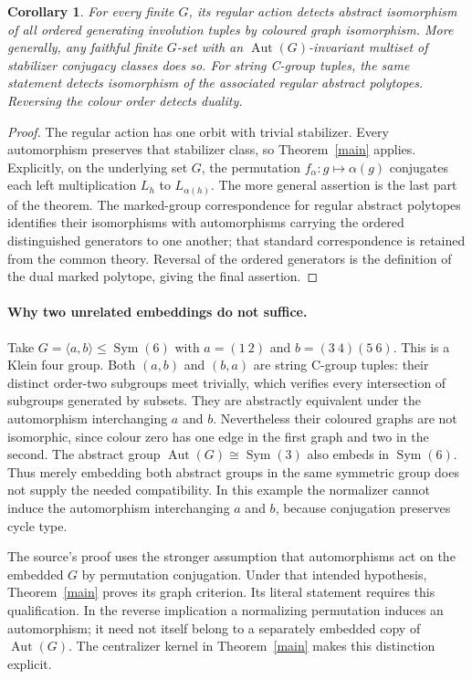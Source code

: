 \documentclass[11pt,a4paper]{article}
\newtheorem{corollary}[theorem]{Corollary}
\newcommand{\Aut}{\operatorname{Aut}}
\newcommand{\Sym}{\operatorname{Sym}}
\begin{document}
\begin{corollary}\label{regular}
For every finite $G$, its regular action detects abstract isomorphism
of all ordered generating involution tuples by coloured graph
isomorphism. More generally, any faithful finite $G$-set with an
$\Aut(G)$-invariant multiset of stabilizer conjugacy classes does so.
For string C-group tuples, the same statement detects isomorphism
of the associated regular abstract polytopes. Reversing the colour
order detects duality.
\end{corollary}
\begin{proof}
The regular action has one orbit with trivial stabilizer. Every
automorphism preserves that stabilizer class, so Theorem~\ref{main}
applies. Explicitly, on the underlying set $G$, the permutation
$f_\alpha:g\mapsto\alpha(g)$ conjugates each left multiplication
$L_h$ to $L_{\alpha(h)}$. The more general assertion is the last
part of the theorem. The marked-group correspondence for regular
abstract polytopes identifies their isomorphisms with automorphisms
carrying the ordered distinguished generators to one another; that
standard correspondence is retained from the common theory.
Reversal of the ordered generators is the definition of the dual
marked polytope, giving the final assertion.
\end{proof}

\paragraph{Why two unrelated embeddings do not suffice.}
Take $G=\langle a,b\rangle\le\Sym(6)$ with
$a=(1\ 2)$ and $b=(3\ 4)(5\ 6)$. This is a Klein four group.
Both $(a,b)$ and $(b,a)$ are string C-group tuples: their distinct
order-two subgroups meet trivially, which verifies every intersection
of subgroups generated by subsets. They are abstractly equivalent
under the automorphism interchanging $a$ and $b$.
Nevertheless their coloured graphs are not isomorphic, since colour
zero has one edge in the first graph and two in the second.
The abstract group $\Aut(G)\cong\Sym(3)$ also embeds in $\Sym(6)$.
Thus merely embedding both abstract groups in the same symmetric
group does not supply the needed compatibility. In this example the
normalizer cannot induce the automorphism interchanging $a$ and $b$,
because conjugation preserves cycle type.

The source's proof uses the stronger assumption that automorphisms
act on the embedded $G$ by permutation conjugation. Under that
intended hypothesis, Theorem~\ref{main} proves its graph criterion.
Its literal statement requires this qualification. In the reverse
implication a normalizing permutation induces an automorphism; it
need not itself belong to a separately embedded copy of $\Aut(G)$.
The centralizer kernel in Theorem~\ref{main} makes this distinction
explicit.
\end{document}
